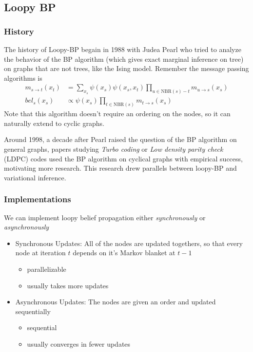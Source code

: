 \documentclass{article}
\begin{document}

\subsection{Loopy BP}
\subsubsection{History} The history of Loopy-BP begain in 1988 with Judea Pearl who tried to analyze the behavior of the BP algorithm (which gives exact marginal inference on tree) on graphs that are not trees, like the Ising model. Remember the message passing algorithms is
\begin{align*}
	m_{s\to t}(x_t) &= \sum_{x_s}\psi(x_s)\psi(x_s,x_t)\prod_{u\in \text{NBR}(s)-t}m_{u\to s}(x_s)\\
	bel_s(x_s) &\propto \psi(x_s)\prod_{t\in \text{NBR}(s)}m_{t\to s}(x_s)
\end{align*}
Note that this algorithm doesn't require an ordering on the nodes, so it can naturally extend to cyclic graphs.

Around 1998, a decade after Pearl raised the question of the BP algorithm on general graphs, papers studying \emph{Turbo coding} or \emph{Low density parity check} (LDPC) codes used the BP algorithm on cyclical graphs with empirical success, motivating more research. This research drew parallels between loopy-BP and variational inference.

\subsubsection{Implementations}
We can implement loopy belief propagation either \emph{synchronously} or \emph{asynchronously}
\begin{itemize}
	\item Synchronous Updates: All of the nodes are updated togethers, so that every node at iteration $t$ depends on it's Markov blanket at $t-1$
	\begin{itemize}
		\item parallelizable
		\item usually takes more updates
	\end{itemize}
	\item Asynchronous Updates: The nodes are given an order and updated sequentially
	\begin{itemize}
		\item sequential
		\item usually converges in fewer updates
	\end{itemize}
\end{itemize}
\end{document}
